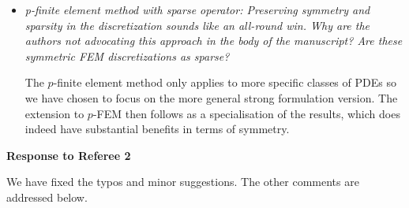 \documentclass[10pt]{letter}
\newcommand{\comment}[1]{\textit{\color{bluey}#1}}
\begin{document}
\begin{itemize}[parsep=1em,leftmargin=1em]
\item \comment{p-finite element method with sparse operator: Preserving symmetry and sparsity in the discretization sounds like an all-round win. Why are the authors not advocating this approach in the body of the manuscript? Are these symmetric FEM discretizations as sparse?}

The $p$-finite element method only applies to more specific classes of PDEs so we have chosen to focus on the more general strong formulation version. The extension to $p$-FEM then follows as a specialisation of the results, which does indeed have substantial benefits in terms of symmetry.


\end{itemize}

\bigskip 

\centerline{\textbf{Response to Referee 2}}

We have fixed the typos and minor suggestions. The other comments are addressed below.
\end{document}
